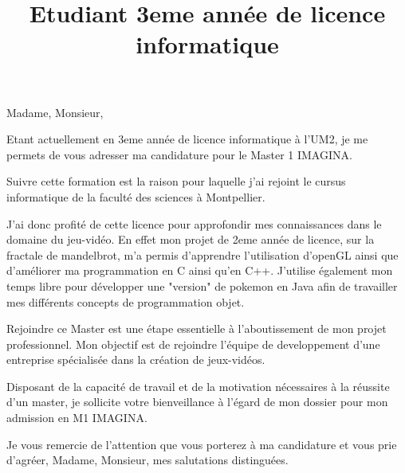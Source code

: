 \documentclass[11pt,a4paper,sans]{moderncv}
\title{Etudiant 3eme année de licence informatique}
\begin{document}
\opening{Madame, Monsieur,}
\makelettertitle

Etant actuellement en 3eme année  de licence informatique à l'UM2, je me permets de vous adresser ma candidature pour le Master 1 IMAGINA.

Suivre cette formation est la raison pour laquelle j'ai rejoint le cursus informatique de la faculté des sciences à Montpellier.

J'ai donc profité de cette licence pour approfondir mes connaissances dans le domaine du jeu-vidéo.
En effet mon projet de 2eme année de licence, sur la fractale de mandelbrot, m'a permis d'apprendre l'utilisation d'openGL ainsi que
d'améliorer ma programmation en C ainsi qu'en C++.
J'utilise également mon temps libre pour développer une "version" de pokemon en Java afin de travailler mes différents concepts de programmation objet.

Rejoindre ce Master est une étape essentielle à l'aboutissement de mon projet professionnel. Mon objectif est de rejoindre l'équipe de developpement d'une entreprise spécialisée dans la création de jeux-vidéos. 


Disposant de la capacité de travail et de la motivation nécessaires à la réussite d'un master, je sollicite votre bienveillance à l'égard de mon dossier pour mon admission en M1 IMAGINA.


Je vous remercie de l'attention que vous porterez à ma candidature et vous prie d'agréer, Madame, Monsieur, mes salutations distinguées.

\makeletterclosing
\end{document}
